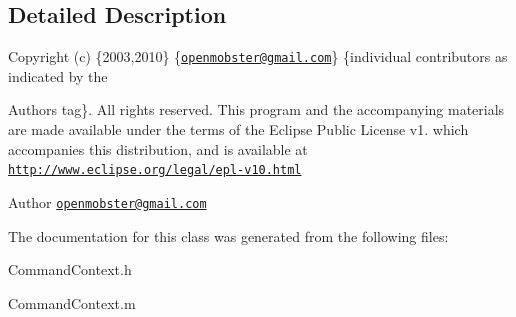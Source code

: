 \subsection{\-Detailed \-Description}
\-Copyright (c) \{2003,2010\} \{\href{mailto:openmobster@gmail.com}{\tt openmobster@gmail.\-com}\} \{individual contributors as indicated by the \begin{DoxyAuthor}{\-Authors}
tag\}. \-All rights reserved. \-This program and the accompanying materials are made available under the terms of the \-Eclipse \-Public \-License v1. which accompanies this distribution, and is available at \href{http://www.eclipse.org/legal/epl-v10.html}{\tt http\-://www.\-eclipse.\-org/legal/epl-\/v10.\-html}
\end{DoxyAuthor}
\begin{DoxyAuthor}{\-Author}
\href{mailto:openmobster@gmail.com}{\tt openmobster@gmail.\-com} 
\end{DoxyAuthor}


\-The documentation for this class was generated from the following files\-:\begin{DoxyCompactItemize}
\item 
\-Command\-Context.\-h\item 
\-Command\-Context.\-m\end{DoxyCompactItemize}
